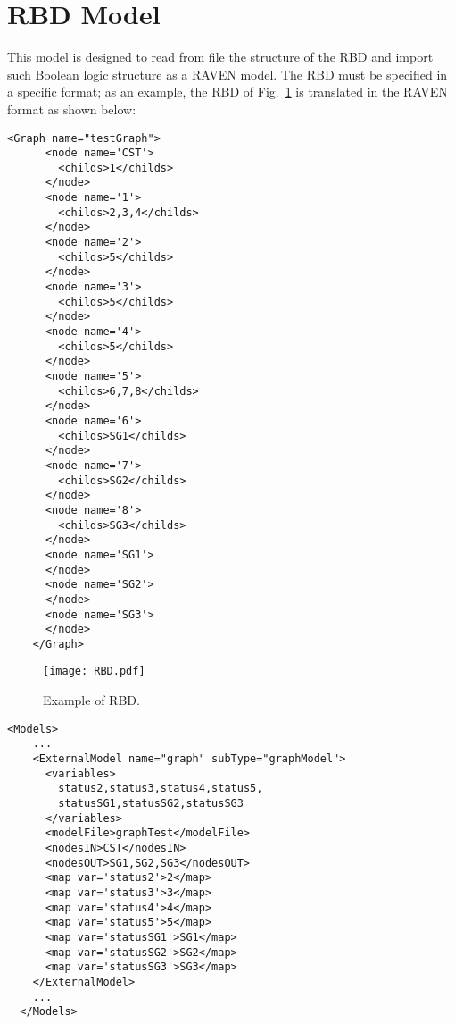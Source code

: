 \section{RBD Model}
\label{sec:RBDmodel}

This model is designed to read from file the structure of the RBD and import such Boolean logic structure as a RAVEN model.
The RBD must be specified in a specific format; as an example, the RBD of Fig.~\ref{fig:RBD} is translated in the RAVEN format as shown below:

\begin{lstlisting}[style=XML,morekeywords={anAttribute},caption=RBD model input example., label=lst:RBDmodel]
	<Graph name="testGraph">
	  <node name='CST'>
	    <childs>1</childs>
	  </node>
	  <node name='1'>
	    <childs>2,3,4</childs>
	  </node>
	  <node name='2'>
	    <childs>5</childs>
	  </node>
	  <node name='3'>
	    <childs>5</childs>
	  </node>
	  <node name='4'>
	    <childs>5</childs>
	  </node>
	  <node name='5'>
	    <childs>6,7,8</childs>
	  </node>
	  <node name='6'>
	    <childs>SG1</childs>
	  </node>
	  <node name='7'>
	    <childs>SG2</childs>
	  </node>
	  <node name='8'>
	    <childs>SG3</childs>
	  </node>
	  <node name='SG1'>
	  </node>
	  <node name='SG2'>
	  </node>
	  <node name='SG3'>
	  </node>
	</Graph>
\end{lstlisting} 

\begin{figure}
    \centering
    \centerline{\texttt{[image: RBD.pdf]}} 
    \caption{Example of RBD.}
    \label{fig:RBD}
\end{figure}

\begin{lstlisting}[style=XML,morekeywords={anAttribute},caption=RBD model input example., label=lst:RBD_InputExample]
  <Models> 
    ...
    <ExternalModel name="graph" subType="graphModel">
      <variables>
        status2,status3,status4,status5,
        statusSG1,statusSG2,statusSG3
      </variables>
      <modelFile>graphTest</modelFile>
      <nodesIN>CST</nodesIN>
      <nodesOUT>SG1,SG2,SG3</nodesOUT>
      <map var='status2'>2</map>
      <map var='status3'>3</map>
      <map var='status4'>4</map>
      <map var='status5'>5</map>
      <map var='statusSG1'>SG1</map>
      <map var='statusSG2'>SG2</map>
      <map var='statusSG3'>SG3</map>
    </ExternalModel>
    ...
  </Models>
\end{lstlisting}

